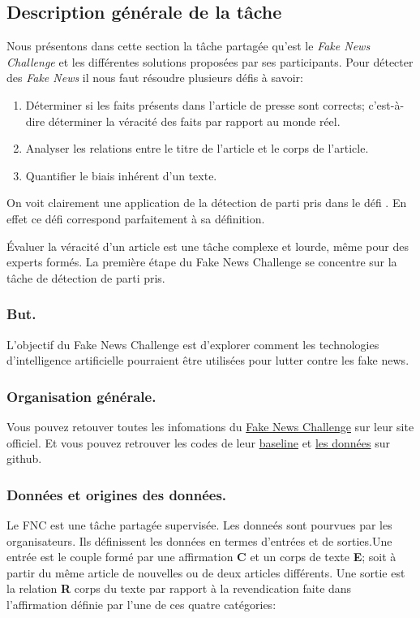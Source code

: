 \documentclass[onecolumn, 12pt]{article}
\begin{document}
\subsection{Description générale de la tâche}
Nous présentons dans cette section la tâche partagée qu'est le \textit{Fake News Challenge} et les différentes solutions proposées par ses participants.
Pour détecter des \textit{Fake News} il nous faut résoudre plusieurs défis à savoir:
\begin{enumerate}
 \item Déterminer si les faits présents dans l'article de presse sont corrects; c'est-à-dire déterminer la véracité des faits par rapport au monde réel.
 \item Analyser les relations entre le titre de l'article et le corps de l'article.
 \item Quantifier le biais inhérent d'un texte.
\end{enumerate}
On voit clairement une application de la détection de parti pris dans le défi .
En effet ce défi correspond parfaitement à sa définition.

Évaluer la véracité d'un article est une tâche complexe et lourde, même pour des experts formés.
La première étape du Fake News Challenge se concentre sur la tâche de détection de parti pris.
\subsubsection{But.}
L'objectif du Fake News Challenge est d'explorer comment les technologies
d'intelligence artificielle pourraient être utilisées pour lutter contre les
fake news.
\subsubsection{Organisation générale.}
Vous pouvez retouver toutes les infomations du \href{http://www.fakenewschallenge.org/}{Fake News Challenge} sur leur site officiel.
Et vous pouvez retrouver les codes de leur \href{https://github.com/FakeNewsChallenge/fnc-1-baseline}{baseline} et \href{https://github.com/FakeNewsChallenge/fnc-1}{les données} sur github.


\subsubsection{Données et origines des données.}
Le FNC est une tâche partagée supervisée.
Les donneés sont pourvues par les organisateurs.
Ils définissent les données en termes d'entrées et de sorties.Une entrée est le couple formé par une affirmation \textbf{C} et un corps de texte \textbf{E}; soit à partir du même article de nouvelles ou de deux articles différents.
Une sortie est la relation \textbf{R} corps du texte par rapport à la revendication faite dans l'affirmation définie par l'une de ces quatre catégories:
\end{document}
